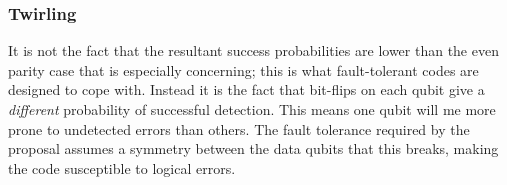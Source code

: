 
\subsubsection{Twirling}

It is not the fact that the resultant success probabilities are lower than the even parity case that is especially concerning; this is what fault-tolerant codes are designed to cope with. Instead it is the fact that bit-flips on each qubit give a \emph{different} probability of successful detection. This means one qubit will me more prone to undetected errors than others. The fault tolerance required by the proposal assumes a symmetry between the data qubits that this breaks, making the code susceptible to logical errors.